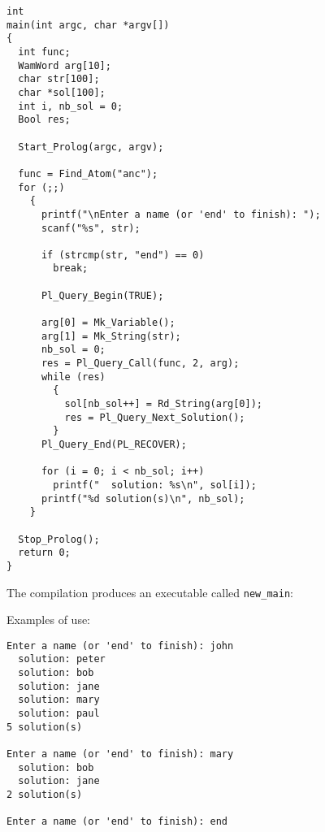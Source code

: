 \begin{Indentation}
\begin{verbatim}
int
main(int argc, char *argv[])
{
  int func;
  WamWord arg[10];
  char str[100];
  char *sol[100];
  int i, nb_sol = 0;
  Bool res;

  Start_Prolog(argc, argv);

  func = Find_Atom("anc");
  for (;;)
    {
      printf("\nEnter a name (or 'end' to finish): ");
      scanf("%s", str);

      if (strcmp(str, "end") == 0)
        break;

      Pl_Query_Begin(TRUE);

      arg[0] = Mk_Variable();
      arg[1] = Mk_String(str);
      nb_sol = 0;
      res = Pl_Query_Call(func, 2, arg);
      while (res)
        {
          sol[nb_sol++] = Rd_String(arg[0]);
          res = Pl_Query_Next_Solution();
        }
      Pl_Query_End(PL_RECOVER);

      for (i = 0; i < nb_sol; i++)
        printf("  solution: %s\n", sol[i]);
      printf("%d solution(s)\n", nb_sol);
    }

  Stop_Prolog();
  return 0;
}
\end{verbatim}
\end{Indentation}

The compilation produces an executable called \texttt{new\_main}:


Examples of use:

\begin{Indentation}
\begin{verbatim}
Enter a name (or 'end' to finish): john
  solution: peter
  solution: bob
  solution: jane
  solution: mary
  solution: paul
5 solution(s)

Enter a name (or 'end' to finish): mary
  solution: bob
  solution: jane
2 solution(s)

Enter a name (or 'end' to finish): end
\end{verbatim}
\end{Indentation}


